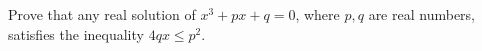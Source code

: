 Prove that any real solution of $x^3+px+q=0$,  where $p,q$ are real numbers, satisfies the inequality $4qx\le p^2$.